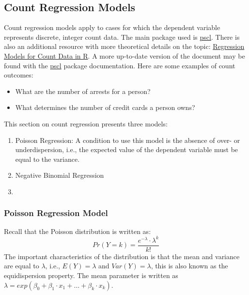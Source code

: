 \documentclass[
]{article}
\providecommand{\tightlist}{%
  \setlength{\itemsep}{0pt}\setlength{\parskip}{0pt}}
\begin{document}
\hypertarget{count-regression-models}{%
\subsection{Count Regression Models}\label{count-regression-models}}

Count regression models apply to cases for which the dependent variable represents discrete, integer count data. The main package used is \href{https://cran.r-project.org/web/packages/pscl/index.html}{pscl}. There is also an additional resource with more theoretical details on the topic: \href{http://dx.doi.org/10.18637/jss.v027.i08}{Regression Models for Count Data in R}. A more up-to-date version of the document may be found with the \href{https://cran.r-project.org/web/packages/pscl/index.html}{pscl} package documentation. Here are some examples of count outcomes:

\begin{itemize}
\tightlist
\item
  What are the number of arrests for a person?
\item
  What determines the number of credit cards a person owns?
\end{itemize}

This section on count regression presents three models:

\begin{enumerate}
\def\labelenumi{\arabic{enumi}.}
\item
  Poisson Regression: A condition to use this model is the absence of over- or underdispersion, i.e., the expected value of the dependent variable must be equal to the variance.
\item
  Negative Binomial Regression
\item
\end{enumerate}

\hypertarget{poisson-regression-model}{%
\subsubsection{Poisson Regression Model}\label{poisson-regression-model}}

Recall that the Poisson distribution is written as:
\[Pr(Y=k)=\frac{e^{-\lambda} \cdot \lambda^k}{k!}\]
The important characteristics of the distribution is that the mean and variance are equal to \(\lambda\), i.e., \(E(Y)=\lambda\) and \(Var(Y)=\lambda\), this is also known as the equidispersion property. The mean parameter is written as \(\lambda=exp(\beta_0+\beta_1 \cdot x_1+ \dots + \beta_k \cdot x_k)\).
\end{document}
